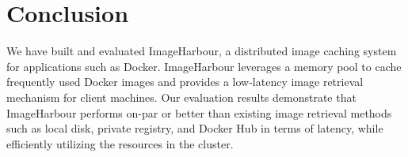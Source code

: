 \section{Conclusion}

We have built and evaluated ImageHarbour, a distributed image caching system for applications such as Docker. ImageHarbour leverages a memory pool to cache frequently used Docker images and provides a low-latency image retrieval mechanism for client machines. Our evaluation results demonstrate that ImageHarbour performs on-par or better than existing image retrieval methods such as local disk, private registry, and Docker Hub in terms of latency, while efficiently utilizing the resources in the cluster. 
